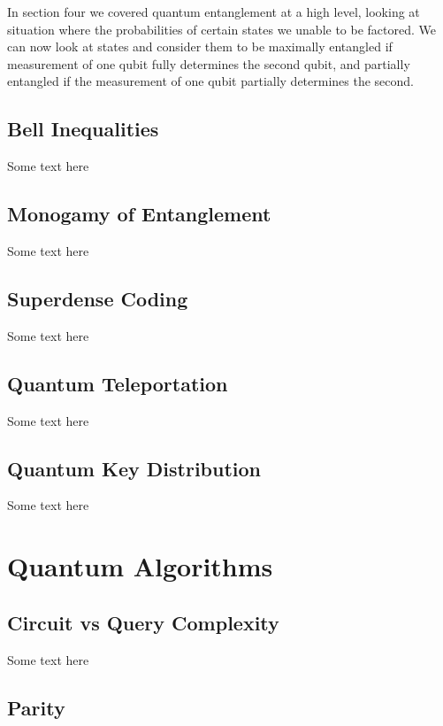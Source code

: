 \documentclass{article}
\begin{document}
In section four we covered quantum entanglement at a high level, looking at situation where the probabilities of certain states we unable to be factored. We can now look at states and consider them to be maximally entangled if measurement of one qubit fully determines the second qubit, and partially entangled if the measurement of one qubit partially determines the second.

\subsection{Bell Inequalities}

Some text here

\subsection{Monogamy of Entanglement}

Some text here

\subsection{Superdense Coding}

Some text here

\subsection{Quantum Teleportation}

Some text here

\subsection{Quantum Key Distribution}

Some text here

\section{Quantum Algorithms} %

\subsection{Circuit vs Query Complexity}

Some text here

\subsection{Parity}
\end{document}
